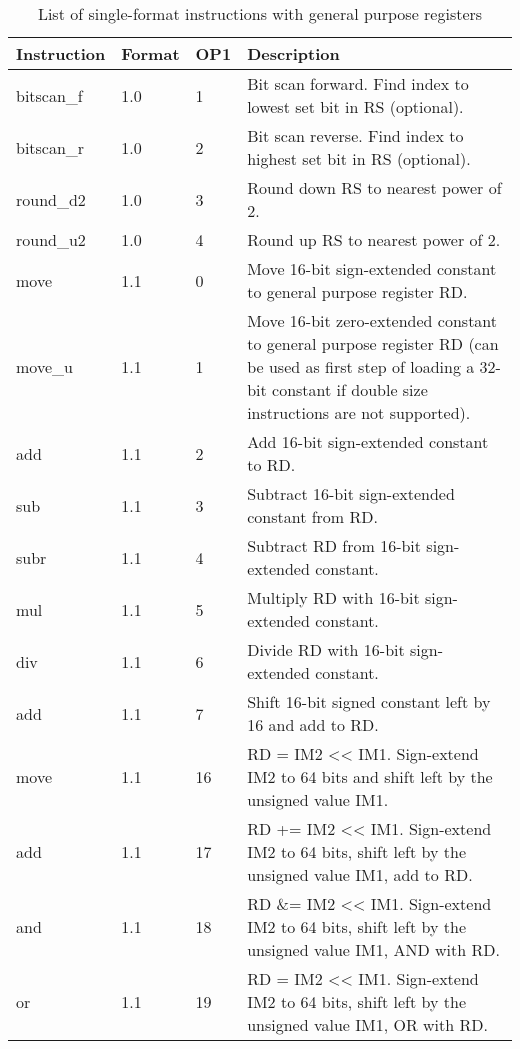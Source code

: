 \documentclass[forwardcom.tex]{subfiles}
\begin{document}
\begin{longtable} {|p{20mm}|p{10mm}|p{8mm}|p{75mm}|}
\caption{List of single-format instructions with general purpose registers} 
\label{table:ListOfSingleFormatInstructionsGP} \\
\endfirsthead
\endhead
\hline
\bfseries Instruction & \bfseries Format &\bfseries OP1 & \bfseries Description \\
\hline
bitscan\_f    & 1.0   &  1 & Bit scan forward. Find index to lowest set bit in RS (optional). \\
bitscan\_r    & 1.0   &  2 & Bit scan reverse. Find index to highest set bit in RS (optional). \\
round\_d2     & 1.0   &  3 & Round down RS to nearest power of 2. \\
round\_u2     & 1.0   &  4 & Round up RS to nearest power of 2. \\
move          & 1.1   &  0 & Move 16-bit sign-extended constant to general purpose register RD. \\
move\_u       & 1.1   &  1 & Move 16-bit zero-extended constant to general purpose register RD
(can be used as first step of loading a 32-bit constant if double size
instructions are not supported). \\
add           & 1.1   &  2  & Add 16-bit sign-extended constant to RD. \\
sub           & 1.1   &  3  & Subtract 16-bit sign-extended constant from RD. \\
subr          & 1.1   &  4  & Subtract RD from 16-bit sign-extended constant. \\
mul           & 1.1   &  5  & Multiply RD with 16-bit sign-extended constant. \\
div           & 1.1   &  6  & Divide RD with 16-bit sign-extended constant. \\
add           & 1.1   &  7  & Shift 16-bit signed constant left by 16 and add to RD. \\
move          & 1.1   & 16  & RD = IM2 \textless\textless{} IM1. Sign-extend IM2 to 64 bits and shift left by the unsigned value IM1. \\
add           & 1.1   & 17  & RD += IM2 \textless\textless{} IM1. Sign-extend IM2 to 64 bits, shift left by the unsigned value IM1, add to RD. \\
and           & 1.1   & 18  & RD \&= IM2 \textless\textless{} IM1. Sign-extend IM2 to 64 bits, shift left by the unsigned value IM1, AND with RD. \\
or            & 1.1   & 19  & RD \textbar{}= IM2 \textless\textless{} IM1. Sign-extend IM2 to 64 bits, shift left by the unsigned value IM1, OR with RD. \\

\end{longtable}
\end{document}
